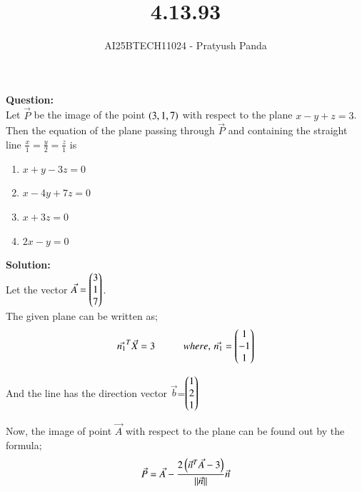 \documentclass[journal]{IEEEtran}
\begin{document}

\vspace{3cm}

\title{4.13.93}
\author{AI25BTECH11024 - Pratyush Panda
}
\maketitle
{\let\newpage\relax\maketitle}

\renewcommand{\thefigure}{\theenumi}
\renewcommand{\thetable}{\theenumi}
\setlength{\intextsep}{10pt} %


\renewcommand{\thetable}{\theenumi}

\textbf{Question: } \\
Let $\Vec{P}$ be the image of the point $\left(3,1,7\right)$ with respect to the plane $x-y+z=3$. Then the equation of the plane passing through $\Vec{P}$ and containing the straight line $\frac{x}{1}=\frac{y}{2}=\frac{z}{1}$ is
\begin{enumerate}
\item $x+y-3z=0$
\item $x-4y+7z=0$
\item $x+3z=0$
\item $2x-y=0$
\end{enumerate}
\vspace{0.7cm}

\textbf{Solution: } \\
Let the vector $\Vec{A}=\begin{pmatrix}3 \\ 1 \\ 7\end{pmatrix}$. \\

The given plane can be written as;
\begin{align}
\Vec{n_1}^T\Vec{X}=3 \hspace{1cm} where, \, \Vec{n_1}=\begin{pmatrix}1 \\ -1 \\ 1\end{pmatrix}
\end{align}

And the line has the direction vector $\Vec{b}$=$\begin{pmatrix}1 \\ 2 \\ 1\end{pmatrix}$

Now, the image of point $\Vec{A}$ with respect to the plane can be found out by the formula;
\begin{align}
\Vec{P}=\Vec{A}-\frac{2\left(\Vec{n}^T\Vec{A}-3\right)}{||\Vec{n}||}\Vec{n}
\end{align}
\end{document}
